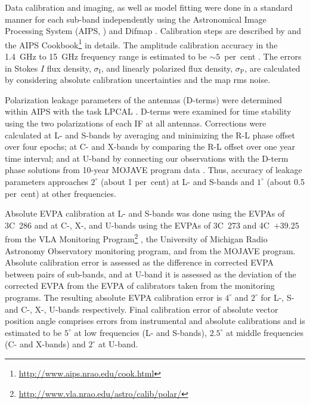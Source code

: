 \documentclass[a4paper,fleqn,usenatbib,useAMS]{mnras}
\begin{document}
Data calibration and imaging, as well as model fitting were done in a standard manner for each  
sub-band independently using the Astronomical Image Processing System (AIPS, \citealt{bridle_greisen_94}) and 
Difmap \citep{shepherd_etal94,shepherd_97}. Calibration steps are described by \citet{sokolovsky_etal11} and
the AIPS Cookbook\footnote{\url{http://www.aips.nrao.edu/cook.html}} in details. 
The amplitude calibration accuracy in the 1.4~GHz to 15~GHz frequency range is estimated to be $\sim 5$~per~cent \citep{sokolovsky_etal11}.
The errors in Stokes $I$ flux density, $\sigma_\mathrm{I}$, and linearly polarized flux density, $\sigma_\mathrm{P}$, are calculated by considering absolute calibration uncertainties and the map rms noise.

Polarization leakage parameters of the antennas (D-terms) were determined within AIPS with the task LPCAL \citep{1995AJ....110.2479L}. 
D-terms were examined for time stability \citep{roberts_etal94,gomez_etal02} using the two polarizations of each IF at all antennas.
Corrections were calculated at L- and S-bands by averaging and minimizing the R-L phase offset over four epochs; 
at C- and X-bands by comparing the R-L offset over one year time interval; and at U-band by connecting our observations with the D-term phase solutions from 10-year MOJAVE program data \citep{lister_etal09,lister_etal13}. 
Thus, accuracy of leakage parameters approaches $2^\circ$ (about 1 per~cent) at L- and S-bands and $1^\circ$ (about 0.5 per~cent) at other frequencies. 

Absolute EVPA calibration at L- and S-bands was done using the EVPAs of 3C~286 and at C-, X-, and U-bands using 
the EVPAs of 3C~273 and 4C~$+$39.25 from the VLA Monitoring 
Program\footnote{\url{http://www.vla.nrao.edu/astro/calib/polar/}} \citep{taylor_myers_00}, 
the University of Michigan Radio Astronomy Observatory monitoring program, and from the MOJAVE program. 
Absolute calibration error is assessed as the difference in corrected EVPA between pairs of sub-bands, 
and at U-band it is assessed as the deviation of the corrected EVPA from the EVPA of calibrators taken from the monitoring programs.
The resulting absolute EVPA calibration error is $4^\circ$ and $2^\circ$ for L-, S- and C-, X-, U-bands respectively.
Final calibration error of absolute vector position angle comprises errors from instrumental and absolute calibrations and is estimated to be $5^\circ$ at low frequencies (L- and S-bands), $2.5^\circ$ at middle frequencies (C- and X-bands) and $2^\circ$ at U-band.
\end{document}

